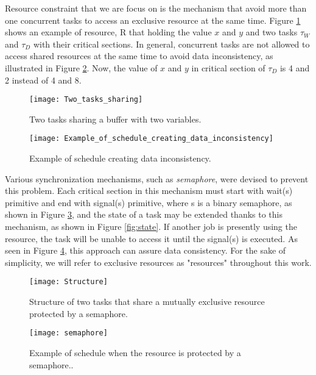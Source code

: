 Resource constraint that we are focus on is the mechanism that avoid more than one concurrent tasks to access an exclusive resource at the same time. Figure \ref{fig:Two_tasks_sharing} shows an example of resource, R that holding the value $x$ and $y$ and two tasks $\tau_{W}$ and $\tau_{D}$ with their critical sections. In general, concurrent tasks are not allowed to access shared resources at the same time to avoid data inconsistency, as illustrated in Figure \ref{fig:Example_of_schedule_creating_data_inconsistency}. Now, the value of $x$ and $y$ in critical section of $\tau_{D}$ is 4 and 2 instead of 4 and 8.

\begin{figure}[ht]
    \centering
    \texttt{[image: Two\_tasks\_sharing]}
    \caption{ Two tasks sharing a buffer with two variables. \cite{b5}}
    \label{fig:Two_tasks_sharing}
\end{figure}

\begin{figure}[ht]
    \centering
    \texttt{[image: Example\_of\_schedule\_creating\_data\_inconsistency]}
    \caption{Example of schedule creating data inconsistency. \cite{b5}}
    \label{fig:Example_of_schedule_creating_data_inconsistency}
\end{figure}

Various synchronization mechanisms, such as \textit{semaphore}, were devised to prevent this problem. Each critical section in this mechanism must start with wait(s) primitive and end with signal(s) primitive, where s is a binary semaphore, as shown in Figure \ref{fig:Structure}, and the state of a task may be extended thanks to this mechanism, as shown in Figure \ref{fig:state}. If another job is presently using the resource, the task will be unable to access it until the signal(s) is executed. As seen in Figure \ref{fig:semaphore}, this approach can assure data consistency. For the sake of simplicity, we will refer to exclusive resources as "resources" throughout this work.

\begin{figure}[ht]
    \centering
    \texttt{[image: Structure]}
    \caption{Structure of two tasks that share a mutually exclusive resource protected by
a semaphore. \cite{b5}}
    \label{fig:Structure}
\end{figure}


\begin{figure}[ht]
    \centering
    \texttt{[image: semaphore]}
    \caption{Example of schedule when the resource is protected by a semaphore.. \cite{b5}}
    \label{fig:semaphore}
\end{figure}

